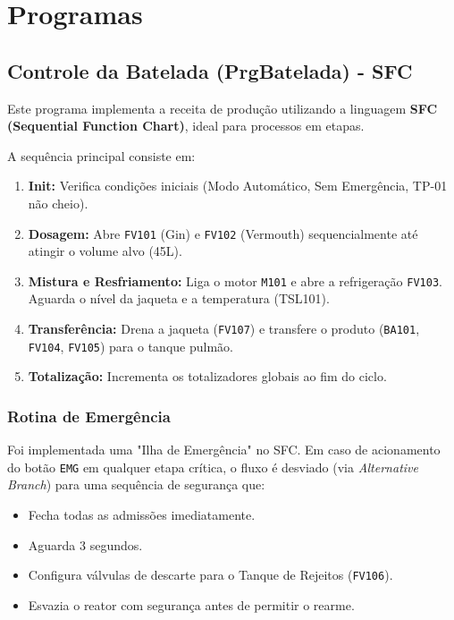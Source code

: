 \section{Programas}\label{sec:programs}

\subsection{Controle da Batelada (PrgBatelada) - SFC}
Este programa implementa a receita de produção utilizando a linguagem \textbf{SFC (Sequential Function Chart)}, ideal para processos em etapas.

A sequência principal consiste em:
\begin{enumerate}
    \item \textbf{Init:} Verifica condições iniciais (Modo Automático, Sem Emergência, TP-01 não cheio).
    \item \textbf{Dosagem:} Abre \texttt{FV101} (Gin) e \texttt{FV102} (Vermouth) sequencialmente até atingir o volume alvo (45L).
    \item \textbf{Mistura e Resfriamento:} Liga o motor \texttt{M101} e abre a refrigeração \texttt{FV103}. Aguarda o nível da jaqueta e a temperatura (TSL101).
    \item \textbf{Transferência:} Drena a jaqueta (\texttt{FV107}) e transfere o produto (\texttt{BA101}, \texttt{FV104}, \texttt{FV105}) para o tanque pulmão.
    \item \textbf{Totalização:} Incrementa os totalizadores globais ao fim do ciclo.
\end{enumerate}

\subsubsection{Rotina de Emergência}
Foi implementada uma "Ilha de Emergência" no SFC. Em caso de acionamento do botão \texttt{EMG} em qualquer etapa crítica, o fluxo é desviado (via \textit{Alternative Branch}) para uma sequência de segurança que:
\begin{itemize}
    \item Fecha todas as admissões imediatamente.
    \item Aguarda 3 segundos.
    \item Configura válvulas de descarte para o Tanque de Rejeitos (\texttt{FV106}).
    \item Esvazia o reator com segurança antes de permitir o rearme.
\end{itemize}

